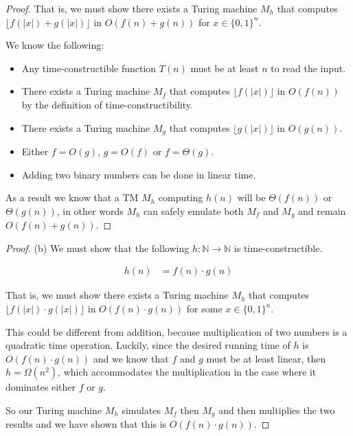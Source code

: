\documentclass[usletter]{article}
\begin{document}
\begin{enumerate}
\begin{proof}
      That is, we must show there exists a Turing machine $M_h$ that computes $\lfloor f(|x|) + g(|x|) \rfloor$ in $O(f(n) + g(n))$ for $x \in \{0,1\}^n$.

      We know the following:

      \begin{itemize}
        \item Any time-constructible function $T(n)$ must be at least $n$ to read the input.

        \item There exists a Turing machine $M_f$ that computes $\lfloor f(|x|) \rfloor$ in $O(f(n))$ by the definition of time-constructibility.

        \item There exists a Turing machine $M_g$ that computes $\lfloor g(|x|) \rfloor$ in $O(g(n))$.

        \item Either $f = O(g)$, $g = O(f)$ or $f = \Theta(g)$.

        \item Adding two binary numbers can be done in linear time.
      \end{itemize}

      As a result we know that a TM $M_h$ computing $h(n)$ will be $\Theta(f(n))$ or $\Theta(g(n))$, in other words $M_h$ can safely emulate both $M_f$ and $M_g$ and remain $O(f(n) + g(n))$.
    \end{proof}

    \begin{proof} (b)
      We must show that the following $h : \mathbb{N} \rightarrow \mathbb{N}$ is time-constructible.

      \begin{align*}
        h(n) &= f(n) \cdot g(n)
      \end{align*}

      That is, we must show there exists a Turing machine $M_h$ that computes $\lfloor f(|x|) \cdot g(|x|) \rfloor$ in $O(f(n) \cdot g(n))$ for some $x \in \{0,1\}^n$.

      This could be different from addition, because multiplication of two numbers is a quadratic time operation. Luckily, since the desired running time of $h$ is $O(f(n) \cdot g(n))$ and we know that $f$ and $g$ must be at least linear, then $h = \Omega(n^2)$, which accommodates the multiplication in the case where it dominates either $f$ or $g$.

      So our Turing machine $M_h$ simulates $M_f$ then $M_g$ and then multiplies the two results and we have shown that this is $O(f(n) \cdot g(n))$.


\end{proof}
\end{enumerate}
\end{document}
